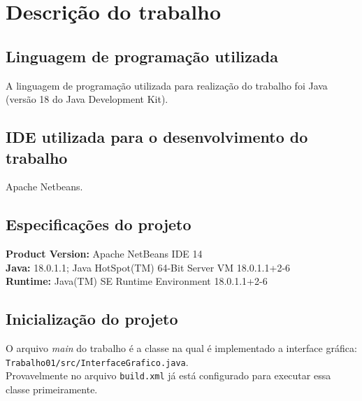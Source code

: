 \section{Descrição do trabalho}
\subsection{Linguagem de programação utilizada}
A linguagem de programação utilizada para realização do trabalho foi Java (versão 18 do Java Development Kit).

\subsection{IDE utilizada para o desenvolvimento do trabalho}
Apache Netbeans.

\subsection{Especificações do projeto}
\textbf{Product Version:} Apache NetBeans IDE 14\\
\textbf{Java:} 18.0.1.1; Java HotSpot(TM) 64-Bit Server VM 18.0.1.1+2-6\\
\textbf{Runtime:} Java(TM) SE Runtime Environment 18.0.1.1+2-6\\

\subsection{Inicialização do projeto}
O arquivo \textit{main} do trabalho é a classe na qual é implementado a interface gráfica:\\\texttt{Trabalho01/src/InterfaceGrafico.java}.\\
Provavelmente no arquivo \texttt{build.xml} já está configurado para executar essa classe primeiramente.
\newpage